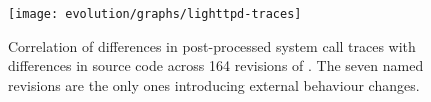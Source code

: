 



\begin{figure}[t]
  \begin{center}
    \texttt{[image: evolution/graphs/lighttpd-traces]}
    \caption{Correlation of differences in post-processed system call
      traces with differences in source code across 164 revisions of
      \lighttpd.  The seven named revisions
      are the only ones introducing external behaviour changes.}
    \label{fig:correlation}
  \end{center}
\end{figure}


